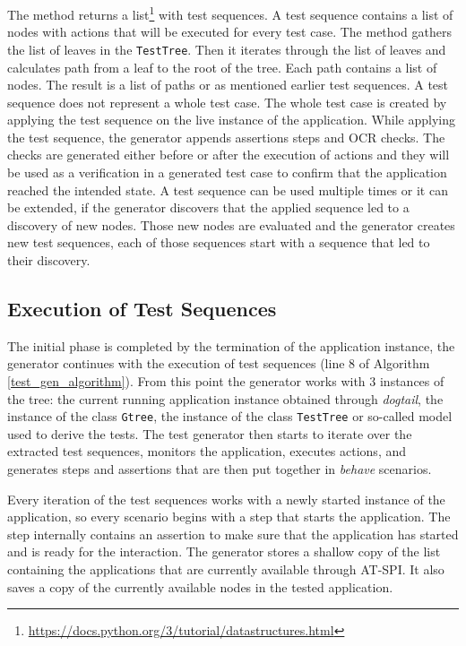 The method returns a list\footnote{\url{https://docs.python.org/3/tutorial/datastructures.html}} with test sequences. A test sequence contains a list of nodes with actions that will be executed for every test case. The method gathers the list of leaves in the \texttt{TestTree}. Then it iterates through the list of leaves and calculates path from a leaf to the root of the tree. Each path contains a list of nodes. The result is a list of paths or as mentioned earlier test sequences. A test sequence does not represent a whole test case. The whole test case is created by applying the test sequence on the live instance of the application. While applying the test sequence, the generator appends assertions steps and OCR checks. The checks are generated either before or after the execution of actions and they will be used as a verification in a generated test case to confirm that the application reached the intended state. A test sequence can be used multiple times or it can be extended, if the generator discovers that the applied sequence led to a discovery of new nodes. Those new nodes are evaluated and the generator creates new test sequences, each of those sequences start with a sequence that led to their discovery. 

\subsection{Execution of Test Sequences}
The initial phase is completed by the termination of the application instance, the generator continues with the execution of test sequences (line 8 of Algorithm \ref{test_gen_algorithm}). From this point the generator works with 3 instances of the tree: the current running application instance obtained through \textit{dogtail}, the instance of the class \texttt{Gtree}, the instance of the class \texttt{TestTree} or so-called model used to derive the tests.
The test generator then starts to iterate over the extracted test sequences, monitors the application, executes actions, and generates steps and assertions that are then put together in \textit{behave} scenarios. 

Every iteration of the test sequences works with a newly started instance of the application, so every scenario begins with a step that starts the application. The step internally contains an assertion to make sure that the application has started and is ready for the interaction. The generator stores a shallow copy of the list containing the applications that are currently available through AT-SPI. It also saves a copy of the currently available nodes in the tested application. 


